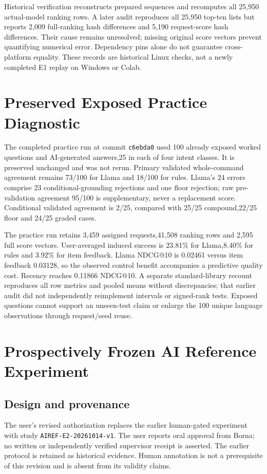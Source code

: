 \documentclass[conference]{IEEEtran}
\begin{document}
Historical verification reconstructs prepared sequences and recomputes all 25,950 actual-model ranking rows. A later audit reproduces all 25,950 top-ten lists but reports 2,009 full-ranking hash differences and 5,190 request-score hash differences. Their cause remains unresolved; missing original score vectors prevent quantifying numerical error. Dependency pins alone do not guarantee cross-platform equality. These records are historical Linux checks, not a newly completed E1 replay on Windows or Colab.

\section{Preserved Exposed Practice Diagnostic}
The completed practice run at commit \texttt{c6ebda0} used 100 already exposed worked questions and AI-generated answers,25 in each of four intent classes. It is preserved unchanged and was not rerun. Primary validated whole-command agreement remains 73/100 for Llama and 18/100 for rules. Llama's 24 errors comprise 23 conditional-grounding rejections and one floor rejection; raw pre-validation agreement 95/100 is supplementary, never a replacement score. Conditional validated agreement is 2/25, compared with 25/25 compound,22/25 floor and 24/25 graded cases.

The practice run retains 3,459 assigned requests,41,508 ranking rows and 2,595 full score vectors. User-averaged induced success is 23.81\% for Llama,8.40\% for rules and 3.92\% for item feedback. Llama NDCG@10 is 0.02461 versus item feedback 0.03128, so the observed control benefit accompanies a predictive quality cost. Recency reaches 0.11866 NDCG@10. A separate standard-library recount reproduces all row metrics and pooled means without discrepancies; that earlier audit did not independently reimplement intervals or signed-rank tests. Exposed questions cannot support an unseen-test claim or enlarge the 100 unique language observations through request/seed reuse.

\section{Prospectively Frozen AI Reference Experiment}
\subsection{Design and provenance}
The user's revised authorization replaces the earlier human-gated experiment with study \texttt{AIREF-E2-20261014-v1}. The user reports oral approval from Borna; no written or independently verified supervisor receipt is asserted. The earlier protocol is retained as historical evidence. Human annotation is not a prerequisite of this revision and is absent from its validity claims.
\end{document}
